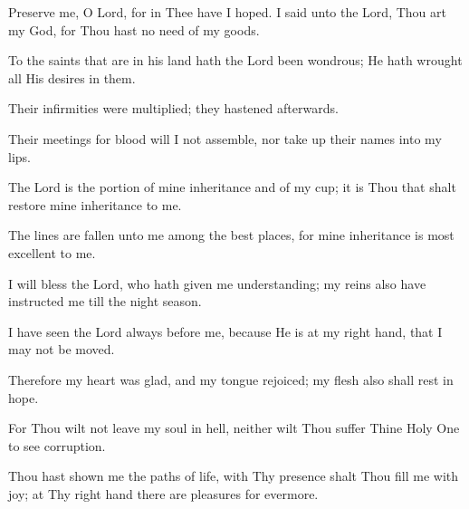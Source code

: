 Preserve me, O Lord, for in Thee have I hoped. I said unto the Lord, Thou art my God, for Thou hast no need of my goods.

To the saints that are in his land hath the Lord been wondrous; He hath wrought all His desires in them.

Their infirmities were multiplied; they hastened afterwards.

Their meetings for blood will I not assemble, nor take up their names into my lips.

The Lord is the portion of mine inheritance and of my cup; it is Thou that shalt restore mine inheritance to me.

The lines are fallen unto me among the best places, for mine inheritance is most excellent to me.

I will bless the Lord, who hath given me understanding; my reins also have instructed me till the night season.

I have seen the Lord always before me, because He is at my right hand, that I may not be moved.

Therefore my heart was glad, and my tongue rejoiced; my flesh also shall rest in hope.

For Thou wilt not leave my soul in hell, neither wilt Thou suffer Thine Holy One to see corruption.

Thou hast shown me the paths of life, with Thy presence shalt Thou fill me with joy; at Thy right hand there are pleasures for evermore.
